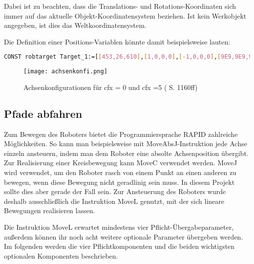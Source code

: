 Dabei ist zu beachten, dass die Translations- und Rotations-Koordinaten sich immer auf das aktuelle Objekt-Koordinatensystem beziehen. Ist kein Werkobjekt angegeben, ist dies das Weltkoordinatensystem. 

\pagebreak
Die Definition einer Positions-Variablen könnte damit beispielsweise lauten:

\begin{lstlisting}[caption=Beispiel für die Definition einer Position, label=robtarget, language=bash]
CONST robtarget Target_1:=[[453,26,610],[1,0,0,0],[-1,0,0,0],[9E9,9E9,9E9,9E9,9E9,9E9]];
\end{lstlisting} 

\begin{figure}[htbp]
\centering
\texttt{[image: achsenkonfi.png]}
\caption{Achsenkonfigurationen für cfx = 0 und cfx =5 (\cite{rapid2} S. 1160ff)} 
\label{achsenkonfi}
\end{figure}

\subsection{Pfade abfahren}
\label{movesection}
Zum Bewegen des Roboters bietet die Programmiersprache RAPID zahlreiche Möglichkeiten. So kann man beispielsweise mit MoveAbsJ-Instruktion jede Achse einzeln ansteuern, indem man dem Roboter eine absolte Achsenposition übergibt. Zur Realisierung einer Kreisbewegung kann MoveC verwendet werden. MoveJ wird verwendet, um den Roboter rasch von einem Punkt an einen anderen zu bewegen, wenn diese Bewegung nicht geradlinig sein muss. In diesem Projekt sollte dies aber gerade der Fall sein. Zur Ansteuerung des Roboters wurde deshalb ausschließlich die Instruktion MoveL genutzt, mit der sich lineare Bewegungen realisieren lassen. 

Die Instruktion MoveL erwartet mindestens vier Pflicht-Übergabeparameter, außerdem können ihr noch acht weitere optionale Parameter übergeben werden. Im folgenden werden die vier Pflichtkomponenten und die beiden wichtigsten optionalen Komponenten beschrieben.

